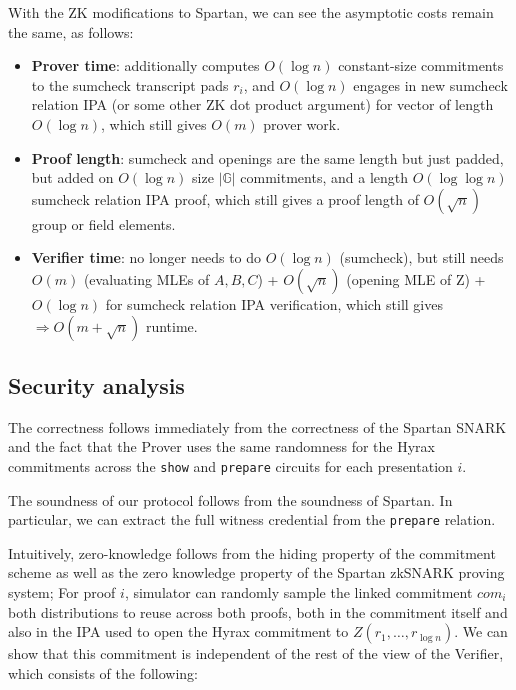 With the ZK modifications to Spartan, we can see the asymptotic costs remain the same, as follows:

\begin{itemize}
    \item \textbf{Prover time}: additionally computes $O(\log n)$ constant-size commitments to the sumcheck transcript pads $r_i$, and $O(\log n)$ engages in new sumcheck relation IPA (or some other ZK dot product argument) for vector of length $O(\log n)$, which still gives $O(m)$ prover work.
    \item \textbf{Proof length}: sumcheck and openings are the same length but just padded, but added on $O(\log n)$ size $|\mathbb{G}|$ commitments, and a length $O(\log\log n)$ sumcheck relation IPA proof, which still gives a proof length of $O(\sqrt n)$ group or field elements.
    \item \textbf{Verifier time}: no longer needs to do $O(\log n)$ (sumcheck), but still needs $O(m)$ (evaluating MLEs of $A,B,C$) + $O(\sqrt{n})$ (opening MLE of Z) + $O(\log n)$ for sumcheck relation IPA verification, which still gives $\Rightarrow O(m + \sqrt{n})$ runtime.
\end{itemize}

\subsection{Security analysis}

The correctness follows immediately from the correctness of the Spartan SNARK and the fact that the Prover uses the same randomness for the Hyrax commitments across the \texttt{show} and \texttt{prepare} circuits for each presentation $i$.  

The soundness of our protocol follows from the soundness of Spartan. In particular, we can extract the full witness credential from the \texttt{prepare} relation.

Intuitively, zero-knowledge follows from the hiding property of the commitment scheme as well as the zero knowledge property of the Spartan zkSNARK proving system;
For proof $i$, simulator can randomly sample the linked commitment $com_i$ both distributions to reuse across both proofs, both in the commitment itself and also in the IPA used to open the Hyrax commitment to $Z(r_1, \dots, r_{\log{n}})$. 
We can show that this commitment is independent of the rest of the view of the Verifier, which consists of the following:

